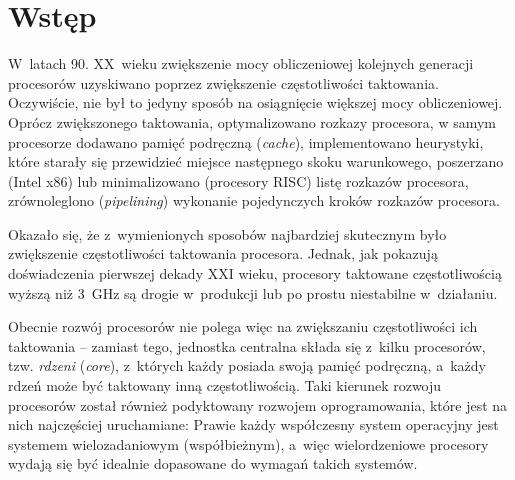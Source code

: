 \section{Wstęp}
%
\indent 
	W~latach 90. XX~wieku zwiększenie mocy obliczeniowej kolejnych generacji procesorów uzyskiwano poprzez zwiększenie 
	częstotliwości taktowania. Oczywiście, nie był to jedyny sposób na osiągnięcie większej mocy obliczeniowej.
	Oprócz zwiększonego taktowania, optymalizowano rozkazy procesora, w samym procesorze dodawano pamięć podręczną 
	(\emph{cache}), implementowano heurystyki, które starały się przewidzieć miejsce następnego skoku warunkowego,
	poszerzano (Intel x86) lub minimalizowano (procesory RISC) listę rozkazów procesora, zrównoleglono (\emph{pipelining})
	wykonanie pojedynczych kroków rozkazów procesora.
\par
%
\indent
	Okazało się, że z~wymienionych sposobów najbardziej skutecznym było zwiększenie częstotliwości taktowania procesora.
	Jednak, jak pokazują doświadczenia pierwszej dekady XXI wieku, procesory taktowane częstotliwością wyższą niż 3~GHz 
	są drogie w~produkcji lub po prostu niestabilne w~działaniu. 
\par
%
\indent
	Obecnie rozwój procesorów nie polega więc na zwiększaniu częstotliwości ich taktowania -- zamiast tego, jednostka centralna
	składa się z~kilku procesorów, tzw. \emph{rdzeni} (\emph{core}), z~których każdy posiada swoją pamięć podręczną, a~każdy
	rdzeń może być taktowany inną częstotliwością.
	Taki kierunek rozwoju procesorów został również podyktowany rozwojem oprogramowania, które jest na nich najczęściej uruchamiane:
	Prawie każdy współczesny system operacyjny jest systemem wielozadaniowym (współbieżnym), a~więc wielordzeniowe procesory wydają się
	być idealnie dopasowane do wymagań takich systemów.
\par
%
